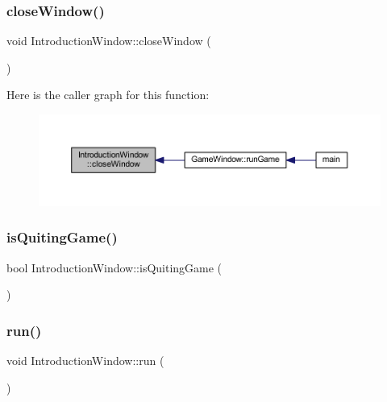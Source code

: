 \subsubsection{\texorpdfstring{close\+Window()}{closeWindow()}}
{\footnotesize\ttfamily void Introduction\+Window\+::close\+Window (\begin{DoxyParamCaption}{ }\end{DoxyParamCaption})}

Here is the caller graph for this function\+:\nopagebreak
\begin{figure}[H]
\begin{center}
\leavevmode
\includegraphics[width=350pt]{class_introduction_window_ac3a87ad4e554621ecd2e374933fbe89d_icgraph}
\end{center}
\end{figure}
\mbox{\label{class_introduction_window_a1d4874be8dcba17d58ba82a848829390}} 
\subsubsection{\texorpdfstring{is\+Quiting\+Game()}{isQuitingGame()}}
{\footnotesize\ttfamily bool Introduction\+Window\+::is\+Quiting\+Game (\begin{DoxyParamCaption}{ }\end{DoxyParamCaption})}

\mbox{\label{class_introduction_window_a18d9a74bc2c18827a8e45758b148f8d7}} 
\subsubsection{\texorpdfstring{run()}{run()}}
{\footnotesize\ttfamily void Introduction\+Window\+::run (\begin{DoxyParamCaption}{ }\end{DoxyParamCaption})}

